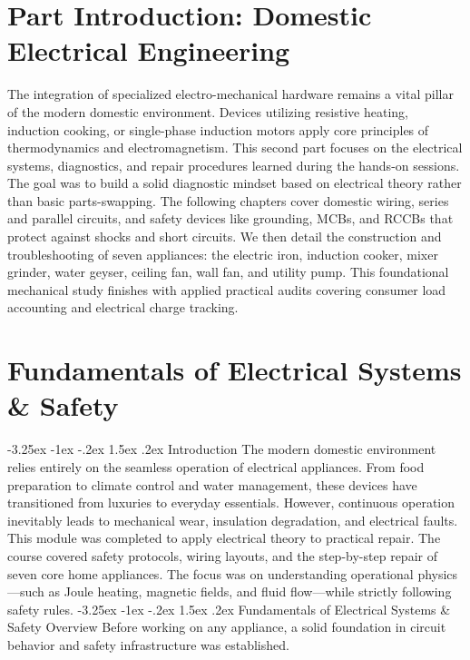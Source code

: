 \documentclass[11pt,a4paper]{report}
\makeatletter
\renewcommand{\section}{\@startsection{section}{1}{\z@}%
  {-3.25ex \@plus -1ex \@minus -.2ex}%
  {1.5ex \@plus.2ex}%
  {\normalfont\Large\bfseries\color{primaryColor}}}
\makeatother
\begin{document}
\chapter*{Part Introduction: Domestic Electrical Engineering}
The integration of specialized electro-mechanical hardware remains a vital pillar of the modern domestic environment. Devices utilizing resistive heating, induction cooking, or single-phase induction motors apply core principles of thermodynamics and electromagnetism. This second part focuses on the electrical systems, diagnostics, and repair procedures learned during the hands-on sessions. The goal was to build a solid diagnostic mindset based on electrical theory rather than basic parts-swapping. The following chapters cover domestic wiring, series and parallel circuits, and safety devices like grounding, MCBs, and RCCBs that protect against shocks and short circuits. We then detail the construction and troubleshooting of seven appliances: the electric iron, induction cooker, mixer grinder, water geyser, ceiling fan, wall fan, and utility pump. This foundational mechanical study finishes with applied practical audits covering consumer load accounting and electrical charge tracking.
\chapter{Fundamentals of Electrical Systems \& Safety}
\section{Introduction}
The modern domestic environment relies entirely on the seamless operation of electrical appliances. From food preparation to climate control and water management, these devices have transitioned from luxuries to everyday essentials. However, continuous operation inevitably leads to mechanical wear, insulation degradation, and electrical faults. This module was completed to apply electrical theory to practical repair. The course covered safety protocols, wiring layouts, and the step-by-step repair of seven core home appliances. The focus was on understanding operational physics—such as Joule heating, magnetic fields, and fluid flow—while strictly following safety rules.
\section{Fundamentals of Electrical Systems \& Safety Overview}
Before working on any appliance, a solid foundation in circuit behavior and safety infrastructure was established.
\end{document}
